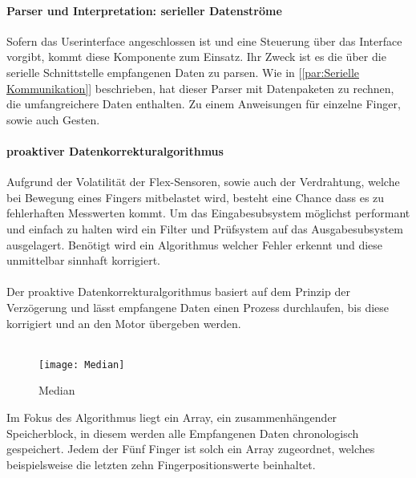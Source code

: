 \documentclass[titlepage,12pt,twoside]{article}
\begin{document}
\paragraph{Parser und Interpretation: serieller Datenströme}
\label{par:Parser und Interpretation: serieller Datenströme}
\hfill \break
\hfill \break
Sofern das Userinterface angeschlossen ist und eine Steuerung über das Interface vorgibt, kommt diese Komponente zum Einsatz. Ihr Zweck ist es die über 
die serielle Schnittstelle empfangenen Daten zu parsen.  Wie in [\textcolor{blue}{\autoref{par:Serielle Kommunikation}}] beschrieben, hat dieser Parser mit 
Datenpaketen zu rechnen, die umfangreichere Daten enthalten. Zu einem Anweisungen für einzelne Finger, sowie auch Gesten. \\

\paragraph{proaktiver Datenkorrekturalgorithmus}
\label{par:proaktiver Datenkorrekturalgorithmus}
\hfill \break
\hfill \break
Aufgrund der Volatilität der Flex-Sensoren, sowie auch der Verdrahtung, welche bei Bewegung eines Fingers mitbelastet wird, besteht eine Chance dass es 
zu fehlerhaften Messwerten kommt. Um das Eingabesubsystem möglichst performant und einfach zu halten wird ein Filter und Prüfsystem auf das 
Ausgabesubsystem ausgelagert. Benötigt wird ein Algorithmus welcher Fehler erkennt und diese unmittelbar sinnhaft korrigiert. \\
\\
Der proaktive Datenkorrekturalgorithmus basiert auf dem Prinzip der Verzögerung und lässt empfangene Daten einen Prozess durchlaufen, bis diese korrigiert 
und an den Motor übergeben werden. \\
\\
\begin{figure}[H]
	\begin{center}
		\scalebox{0.8}
		{\texttt{[image: Median]}}
		\caption{Median}
		\label{fig:Median}		
	\end{center}
\end{figure}
\hfill \break
Im Fokus des Algorithmus liegt ein Array, ein zusammenhängender Speicherblock, in diesem werden alle Empfangenen Daten chronologisch gespeichert. Jedem 
der Fünf Finger ist solch ein Array zugeordnet, welches beispielsweise die letzten zehn Fingerpositionswerte beinhaltet. \\
\\
\end{document}
